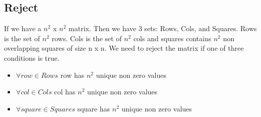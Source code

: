 \documentclass{sig-alternate}
\begin{document}
\subsection{Reject}
If we have a $n^2$ x $n^2$ matrix. Then we have 3 sets: Rows, Cols, and Squares. Rows is the set of $n^2$ rows. Cols is the set of $n^2$ cols and squares contains $n^2$ non overlapping squares of size n x n. We need to reject the matrix if one of three conditions is true. 
\begin{itemize}
\item{$\forall row \in Rows$ row has $n^2$ unique non zero values}
\item{$\forall col \in Cols$ col has $n^2$ unique non zero values}
\item{$\forall square \in Squares$ square has $n^2$ unique non zero values}
\end{itemize}
\end{document}

